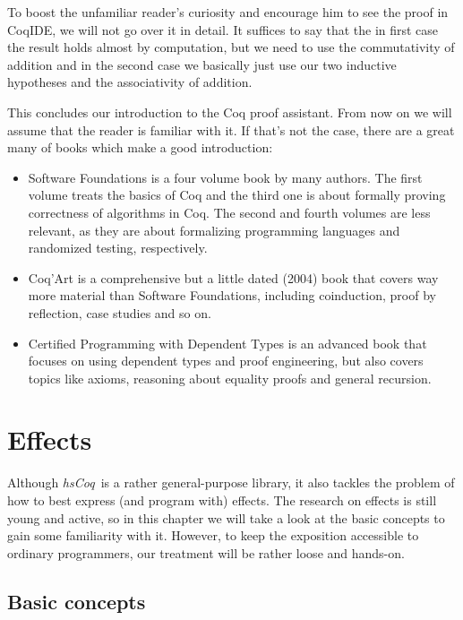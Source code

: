 \documentclass[declaration,inz,english,shortabstract]{iithesis}
\newcommand{\libname}{\textit{hsCoq}}
\begin{document}
To boost the unfamiliar reader's curiosity and encourage him to see the proof in CoqIDE, we will not go over it in detail. It suffices to say that the in first case the result holds almost by computation, but we need to use the commutativity of addition and in the second case we basically just use our two inductive hypotheses and the associativity of addition.

This concludes our introduction to the Coq proof assistant. From now on we will assume that the reader is familiar with it. If that's not the case, there are a great many of books which make a good introduction:

\begin{itemize}
    \item Software Foundations \cite{SoftwareFoundations} is a four volume book by many authors. The first volume treats the basics of Coq and the third one is about formally proving correctness of algorithms in Coq. The second and fourth volumes are less relevant, as they are about formalizing programming languages and randomized testing, respectively.
    \item Coq'Art \cite{CoqArt} is a comprehensive but a little dated (2004) book that covers way more material than Software Foundations, including coinduction, proof by reflection, case studies and so on.
    \item Certified Programming with Dependent Types \cite{CPDT} is an advanced book that focuses on using dependent types and proof engineering, but also covers topics like axioms, reasoning about equality proofs and general recursion.
\end{itemize}

\chapter{Effects}

Although \libname\ is a rather general-purpose library, it also tackles the problem of how to best express (and program with) effects. The research on effects is still young and active, so in this chapter we will take a look at the basic concepts to gain some familiarity with it. However, to keep the exposition accessible to ordinary programmers, our treatment will be rather loose and hands-on.

\section{Basic concepts}
\end{document}
